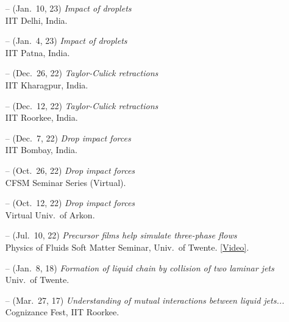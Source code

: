 \documentclass[10pt,a4paper,colorlinks,linkcolor=blue,urlcolor=blue,citecolor=blue]{moderncv}
\begin{document}
\begin{itemize}[leftmargin=1.25em]
\item[--] (Jan.~10, 23) \emph{Impact of droplets} \\
  IIT Delhi, India.
\item[--] (Jan.~4, 23) \emph{Impact of droplets} \\
  IIT Patna, India.
\item[--] (Dec.~26, 22) \emph{Taylor-Culick retractions} \\
  IIT Kharagpur, India.
\item[--] (Dec.~12, 22) \emph{Taylor-Culick retractions} \\
  IIT Roorkee, India.
\item[--] (Dec.~7, 22) \emph{Drop impact forces} \\
  IIT Bombay, India.
\item[--] (Oct.~26, 22) \emph{Drop impact forces} \\
  CFSM Seminar Series (Virtual).
\item[--] (Oct.~12, 22) \emph{Drop impact forces} \\
  Virtual Univ.~of Arkon.
\item[--] (Jul.~10, 22) \emph{Precursor films help simulate three-phase flows} \\
  Physics of Fluids Soft Matter Seminar, Univ.~of Twente. \href{https://youtu.be/ozrnYe8u1HA?si=DA4JIFjNozmPsQuE}{[Video]}.
\item[--] (Jan.~8, 18) \emph{Formation of liquid chain by collision of two laminar jets} \\
  Univ.~of Twente.
\item[--] (Mar.~27, 17) \emph{Understanding of mutual interactions between liquid jets...} \\
  Cognizance Fest, IIT Roorkee.
\end{itemize}
\end{document}
